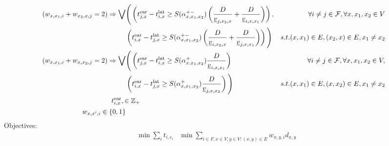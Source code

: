 \documentclass[../thesis.tex]{subfiles}
\begin{document}
\begin{align}
    (w_{x,x_{1},i} + w_{x_{2},x,j} = 2) \Rightarrow  \bigvee&
    \Bigg(\left(t^\text{ear}_{j,x}-t^\text{lat}_{i,x}\geq S(\alpha^{+-}_{x,x_1,x_2})\left(\frac D{\underline v_{j,x_2,x}} + \frac D{\underline v_{i,x,x_1}}\right)\right)
    ,\nonumber & \forall i\neq j \in \mathcal{F}, \forall x,x_{1}, x_{2} \in V
    \\&\left(t^\text{ear}_{i,x}-t^\text{lat}_{j,x}\geq S(\alpha^{+-}_{x,x_1,x_2})\left(\frac D{\underline v_{i,x_2,x}}+\frac D{\underline v_{j,x,x_1}}\right)\right)\Bigg)&
     s.t. (x,x_{1}) \in E, (x_{2},x) \in E, x_1\neq x_2   \\
    (w_{x,x_{1},i} + w_{x,x_{2},j} = 2) \Rightarrow \bigvee&\Bigg(
    \left(
    t^\text{ear}_{j,x}-t^\text{lat}_{i,x}\geq S(\alpha^+_{x,x_1,x_2}) \frac D{\underline v_{i,x,x_1}}\right)
    &  \forall i \neq j \in \mathcal{F}, \forall x,x_{1}, x_{2} \in V 
    ,\nonumber\\&\left(
    t^\text{ear}_{i,x}-t^\text{lat}_{j,x}\geq S(\alpha^+_{x,x_1,x_2})\frac D {\underline v_{j,x,x_2}}
    \right)\Bigg)
    & s.t. (x,x_{1}) \in E, (x,x_{2}) \in E,x_1\neq x_2 \\
    \mathclap{t^\text{ear}_{i,x}, \in \mathbb{Z}_{+}} \nonumber \\
    w_{x,x',i} \in \{0,1\} \nonumber
\end{align}
Objectives:
\begin{align}
    &\min \sum_{i} t_{i,e_{i}}
    &\min \sum_{i \in F,x \in V,y \in V:(x,y)\in E} w_{x,y,i}d_{x,y}
\end{align}
\end{document}
